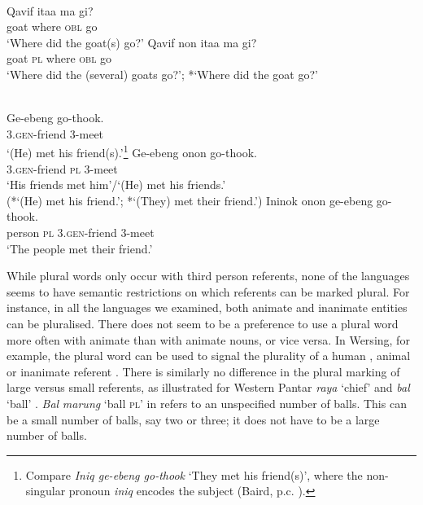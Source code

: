 \ea
{} \\
\label{bkm:Ref334184518}
\ea
\gll  Qavif ita{{\textglotstop}}{a} ma gi? \\
 goat where \textsc{obl} go \\
\glt `Where did the goat(s) go?'
\ex
\gll Qavif non ita{{\textglotstop}}a  ma gi? \\
 goat \textsc{pl} where \textsc{obl} go \\
\glt `Where did the (several) goats go?';  *`Where did the goat go?'
\z
\z

\ea\label{bkm:Ref354060976}
 \\
  \ea
  \gll Ge-ebeng go-thook. \\
  3.\textsc{gen}-friend 3-meet \\
\glt `(He) met his friend(s).'\footnote{Compare \textit{Iniq ge-ebeng go-thook} `They met his friend(s)', where the non-singular pronoun \textit{iniq} encodes the subject (Baird, p.c. ).}
  \ex
  \gll Ge-ebeng onon go-thook. \\
  3.\textsc{gen}-friend \textsc{pl} 3-meet \\
\glt `His friends met him'/`(He) met his friends.'\\
  (*`(He) met his friend.'; *`(They) met their friend.')
  \ex
  \gll Ininok onon ge-ebeng go-thook. \\
  person  \textsc{pl} 3.\textsc{gen}-friend 3-meet \\
\glt `The people met their friend.'
  \z
\z

While plural words only occur with third person referents, none of the languages seems to have semantic restrictions on which referents can be marked plural. For instance, in all the languages we examined, both animate and inanimate entities can be pluralised. There does not seem to be a preference to use a plural word more often with animate than with animate nouns, or vice versa. In Wersing, for example, the plural word can be used to signal the plurality of a human , animal  or inanimate referent . There is similarly no difference in the plural marking of large versus small referents, as illustrated for Western Pantar \textit{raya} `chief'  and \textit{bal} `ball' . \textit{Bal} \textit{marung} `ball \textsc{pl'} in  refers to an unspecified number of balls. This can be a small number of balls, say two or three; it does not have to be a large number of balls.




